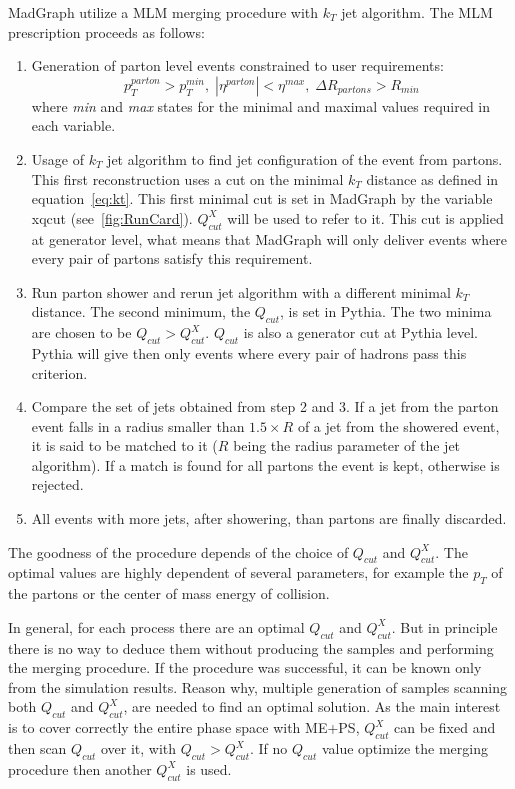 MadGraph utilize a MLM merging procedure with $k_{T}$ jet algorithm. The MLM prescription proceeds as follows:
\begin{enumerate}
\item Generation of parton level events constrained to user requirements:
  \begin{equation*}
    p_{T}^{parton}>p_{T}^{min}, \; |\eta^{parton}|<\eta^{max}, \; \Delta R_{partons}>R_{min}
  \end{equation*} where \textit{min} and \textit{max} states for the minimal and maximal values required in each variable.
\item Usage of $k_{T}$ jet algorithm to find jet configuration of the event from partons. This first reconstruction uses a cut on the minimal $k_{T}$ distance as defined in equation~\ref{eq:kt}. This first minimal cut is set in MadGraph by the variable xqcut (see~\ref{fig:RunCard}). $Q^{X}_{cut}$ will be used to refer to it. This cut is applied at generator level, what means that MadGraph will only deliver events where every pair of partons satisfy this requirement.
\item Run parton shower and rerun jet algorithm with a different minimal $k_{T}$ distance. The second minimum, the $Q_{cut}$, is set in Pythia. The two minima are chosen to be $Q_{cut}>Q^{X}_{cut}$. $Q_{cut}$ is also a generator cut at Pythia level. Pythia will give then only events where every pair of hadrons pass this criterion.
\item Compare the set of jets obtained from step 2 and 3. If a jet from the parton event falls in a radius smaller than $1.5 \times R$ of a jet from the showered event, it is said to be matched to it ($R$ being the radius parameter of the jet algorithm). If a match is found for all partons the event is kept, otherwise is rejected.
\item All events with more jets, after showering, than partons are finally discarded.   
\end{enumerate}

The goodness of the procedure depends of the choice of $Q_{cut}$ and $Q^{X}_{cut}$. The optimal values are highly dependent of several parameters, for example the $p_{T}$ of the partons or the center of mass energy of collision. 

In general, for each process there are an optimal $Q_{cut}$ and $Q^{X}_{cut}$. But in principle there is no way to deduce them without producing the samples and performing the merging procedure. If the procedure was successful, it can be known only from the simulation results. Reason why, multiple generation of samples scanning both $Q_{cut}$ and $Q^{X}_{cut}$, are needed to find an optimal solution. As the main interest is to cover correctly the entire phase space with ME+PS, $Q^{X}_{cut}$ can be fixed and then scan $Q_{cut}$ over it, with $Q_{cut}>Q^{X}_{cut}$. If no $Q_{cut}$ value optimize the merging procedure then another $Q^{X}_{cut}$ is used. 


